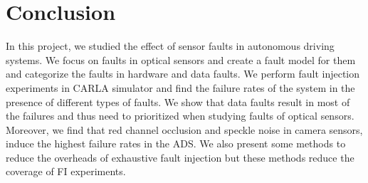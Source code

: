 \section{Conclusion}

In this project, we studied the effect of sensor faults in autonomous driving systems. We focus on faults in optical sensors and create a fault model for them and categorize the faults in hardware and data faults. We perform fault injection experiments in CARLA simulator and find the failure rates of the system in the presence of different types of faults. We show that data faults result in most of the failures and thus need to prioritized when studying faults of optical sensors. Moreover, we find that red channel occlusion and speckle noise in camera sensors, induce the highest failure rates in the ADS. We also present some methods to reduce the overheads of exhaustive fault injection but these methods reduce the coverage of FI experiments.